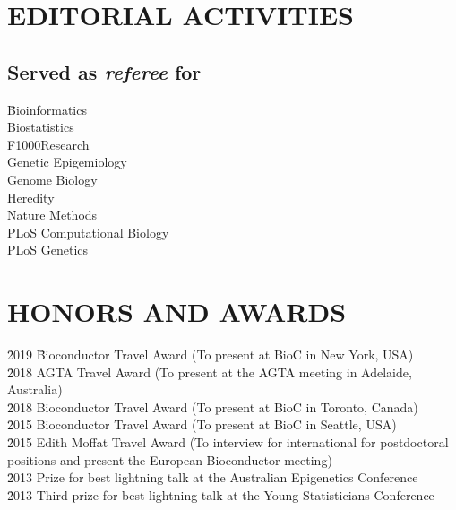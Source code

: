 \documentclass[11pt,letterpaper,pdf]{article}
\begin{document}



\section*{EDITORIAL ACTIVITIES}

\subsection*{Served as \textit{referee} for}

\begin{tabbing}
  \=Bioinformatics\\
  \>Biostatistics\\
  \>F1000Research\\
  \>Genetic Epigemiology\\
  \>Genome Biology\\
  \>Heredity\\
  \>Nature Methods\\
  \>PLoS Computational Biology\\
  \>PLoS Genetics\\
\end{tabbing}

\section*{HONORS AND AWARDS}


\begin{tabbing}
  \= 2019 \hspace*{0.5cm} \= Bioconductor Travel Award (To present at BioC in New York, USA)\\
  \= 2018 \> AGTA Travel Award (To present at the AGTA meeting in Adelaide, Australia)\\
  \= 2018 \> Bioconductor Travel Award (To present at BioC in Toronto, Canada)\\
  \= 2015 \> Bioconductor Travel Award (To present at BioC in Seattle, USA)\\
  \= 2015 \> Edith Moffat Travel Award (To interview for international for postdoctoral positions and present the European Bioconductor meeting)\\
  \= 2013 \> Prize for best lightning talk at the Australian Epigenetics Conference\\
  \= 2013 \> Third prize for best lightning talk at the Young Statisticians Conference
\end{tabbing}
\end{document}
